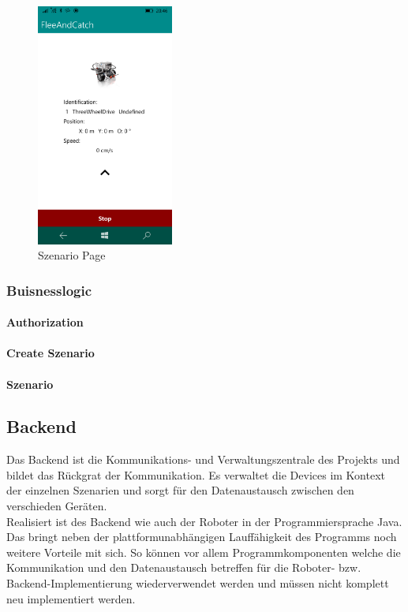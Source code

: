 \begin{figure}[h]
	\begin{center}
		\includegraphics[width=0.4\textwidth]{images/implementation/szenario.png}
	\end{center}	
	\caption{Szenario Page}
	\label{fig:szenario}
\end{figure}

\newpage
\subsubsection{Buisnesslogic} %

\paragraph{Authorization}

\paragraph{Create Szenario}

\paragraph{Szenario}

\newpage
\subsection{Backend}
Das Backend ist die Kommunikations- und Verwaltungszentrale des Projekts und bildet das Rückgrat der Kommunikation. Es verwaltet die 
Devices im Kontext der einzelnen Szenarien und sorgt für den Datenaustausch zwischen den verschieden Geräten. \\
Realisiert ist des Backend wie auch der Roboter in der Programmiersprache Java. Das bringt neben der plattformunabhängigen 
Lauffähigkeit des Programms noch weitere Vorteile mit sich. So können vor allem Programmkomponenten welche die Kommunikation und
den Datenaustausch betreffen für die Roboter- bzw. Backend-Implementierung wiederverwendet werden und müssen nicht komplett neu
implementiert werden.
